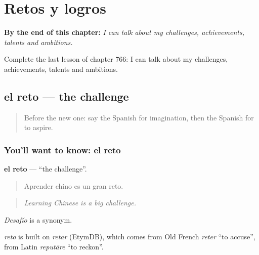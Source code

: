 
\chapter{Retos y logros}
\label{ch:es-retos-y-logros}

\begin{chapteropening}
\textbf{By the end of this chapter:} \emph{I can talk about my challenges, achievements, talents and ambitions.}

Complete the last lesson of chapter 766: I can talk about my challenges, achievements, talents and ambitions.
\end{chapteropening}

\section[el reto]{el reto — the challenge}

\label{lesson:ES-C766-reto}



\begin{quote}
Before the new one: say the Spanish for imagination, then the Spanish for to aspire.
\end{quote}

\subsection*{You'll want to know: el reto}
\textbf{el reto} — \textquotedblleft{}the challenge\textquotedblright{}.

\begin{quote}
Aprender chino es un gran reto.
\end{quote}

\begin{quote}
\emph{Learning Chinese is a big challenge.}
\end{quote}

\emph{Desafío} is a synonym.

\begin{cousinweb}
\emph{reto} is built on \emph{retar} (EtymDB), which comes from Old French \emph{reter} \textquotedblleft{}to accuse\textquotedblright{}, from Latin \emph{reputāre} \textquotedblleft{}to reckon\textquotedblright{}.
\end{cousinweb}

